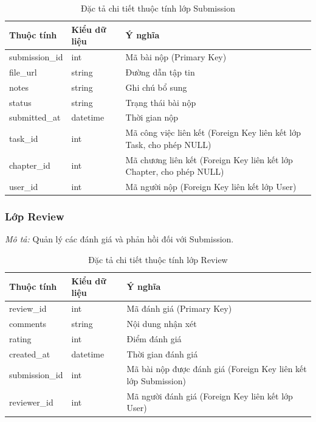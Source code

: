 \begin{table}[H]
\centering
\renewcommand{\arraystretch}{1.3}
\begin{tabularx}{\textwidth}{|p{4cm}|p{3cm}|>{\raggedright\arraybackslash}X|}
\hline
\rowcolor{tableheader}
\textbf{Thuộc tính} & \textbf{Kiểu dữ liệu} & \textbf{Ý nghĩa} \\ \hline
submission\_id & int & Mã bài nộp (Primary Key) \\ \hline
file\_url & string & Đường dẫn tập tin \\ \hline
notes & string & Ghi chú bổ sung \\ \hline
status & string & Trạng thái bài nộp \\ \hline
submitted\_at & datetime & Thời gian nộp \\ \hline
task\_id & int & Mã công việc liên kết (Foreign Key liên kết lớp Task, cho phép NULL) \\ \hline
chapter\_id & int & Mã chương liên kết (Foreign Key liên kết lớp Chapter, cho phép NULL) \\ \hline
user\_id & int & Mã người nộp (Foreign Key liên kết lớp User) \\ \hline
\end{tabularx}
\caption{Đặc tả chi tiết thuộc tính lớp Submission}
\label{tab:class_submission}
\end{table}


\subsubsection{Lớp Review}
\textit{Mô tả:} Quản lý các đánh giá và phản hồi đối với Submission.

\begin{table}[H]
\centering
\renewcommand{\arraystretch}{1.3}
\begin{tabularx}{\textwidth}{|p{4cm}|p{3cm}|>{\raggedright\arraybackslash}X|}
\hline
\rowcolor{tableheader}
\textbf{Thuộc tính} & \textbf{Kiểu dữ liệu} & \textbf{Ý nghĩa} \\ \hline
review\_id & int & Mã đánh giá (Primary Key) \\ \hline
comments & string & Nội dung nhận xét \\ \hline
rating & int & Điểm đánh giá \\ \hline
created\_at & datetime & Thời gian đánh giá \\ \hline
submission\_id & int & Mã bài nộp được đánh giá (Foreign Key liên kết lớp Submission) \\ \hline
reviewer\_id & int & Mã người đánh giá (Foreign Key liên kết lớp User) \\ \hline
\end{tabularx}
\caption{Đặc tả chi tiết thuộc tính lớp Review}
\label{tab:class_review}
\end{table}


